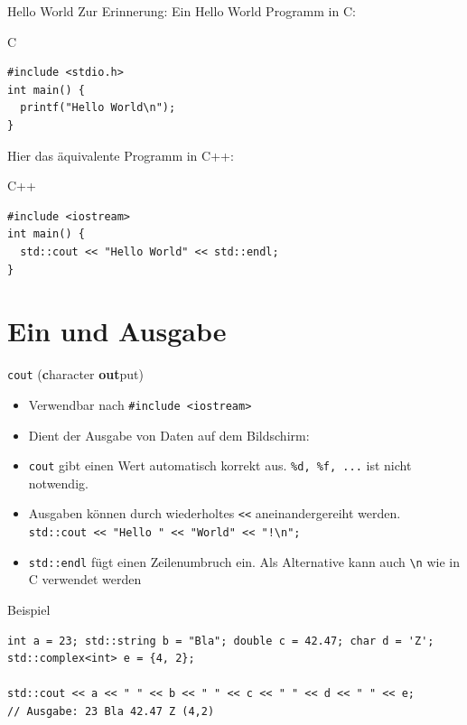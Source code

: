 \documentclass[presentation]{beamer}
\begin{document}
\begin{frame}[fragile,label={sec:org749e845}]{Hello World}
 Zur Erinnerung: Ein Hello World Programm in C:
\begin{block}{C}
\begin{verbatim}
#include <stdio.h>
int main() {
  printf("Hello World\n");
}
\end{verbatim}
\end{block}
Hier das äquivalente Programm in C++:
\begin{block}{C++}
\begin{verbatim}
#include <iostream>
int main() {
  std::cout << "Hello World" << std::endl;
}
\end{verbatim}
\end{block}
\end{frame}
\section{Ein und Ausgabe}
\label{sec:org43d9c99}
\begin{frame}[fragile,label={sec:org9c64a01}]{\texttt{cout} (\textbf{c}haracter \textbf{out}put)}
 \begin{itemize}
\item Verwendbar nach {\color{solarizedYellow}\texttt{\#include <iostream>}}
\item Dient der \alert{Ausgabe} von Daten auf dem Bildschirm: 
\item {\color{solarizedYellow}\texttt{cout} }gibt einen Wert \alert{automatisch korrekt} aus. {\color{solarizedYellow}\texttt{\%d, \%f, ...}}
ist nicht notwendig.
\item Ausgaben können durch wiederholtes {\color{solarizedYellow}\texttt{<<} }aneinandergereiht werden.\newline
{\color{solarizedYellow}\texttt{std::cout << "Hello " << "World" << "!\textbackslash{}n";}}
\item {\color{solarizedYellow}\texttt{std::endl} }fügt einen Zeilenumbruch ein. Als Alternative kann auch
{\color{solarizedYellow}\texttt{\textbackslash{}n} }wie in C verwendet werden
\end{itemize}
\begin{block}{Beispiel}
\begin{verbatim}
int a = 23; std::string b = "Bla"; double c = 42.47; char d = 'Z';
std::complex<int> e = {4, 2};

std::cout << a << " " << b << " " << c << " " << d << " " << e;
// Ausgabe: 23 Bla 42.47 Z (4,2)
\end{verbatim}
\end{block}
\end{frame}
\end{document}
